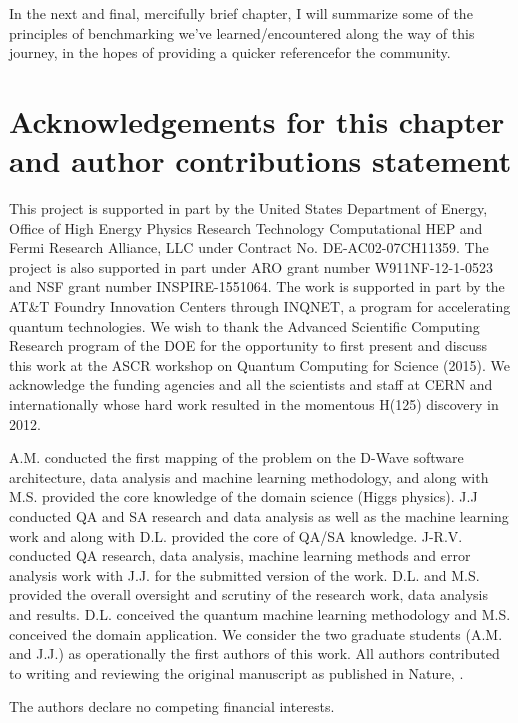 In the next and final, mercifully brief chapter, I will summarize some of the principles of benchmarking we've learned/encountered along the way of this journey, in the hopes of providing a quicker referencefor the community.


\section{Acknowledgements for this chapter and author contributions statement}
This project is supported in part by the  United States Department of Energy, Office of High Energy Physics Research Technology Computational HEP and Fermi Research Alliance, LLC under Contract No. DE-AC02-07CH11359.  The project is also supported in part under ARO grant number W911NF-12-1-0523 and NSF grant number INSPIRE-1551064. The work is supported in part by the AT\&T Foundry Innovation Centers through INQNET, a program for accelerating quantum technologies.  We wish to thank the Advanced Scientific Computing Research program of the DOE for the opportunity to first present and discuss this work at the ASCR workshop on Quantum Computing for Science (2015). We  acknowledge the funding agencies and all the scientists and staff at CERN and internationally whose  hard work resulted in the momentous H(125) discovery in 2012.

A.M. conducted  the first mapping of the problem on the D-Wave software architecture, data analysis and machine learning methodology,  and along with M.S. provided the core knowledge of the domain science (Higgs physics). J.J conducted  QA and SA  research and data analysis as well as the machine learning work and along with D.L. provided the core of QA/SA knowledge. J-R.V. conducted  QA research, data analysis, machine learning methods and error analysis work with J.J. for the submitted version of the work.  D.L. and M.S. provided the overall oversight and scrutiny of the research work, data analysis and results.  D.L. conceived the quantum machine learning methodology and M.S. conceived the domain application.   We consider the two graduate students (A.M. and J.J.) as operationally the first authors of this work. All authors contributed to writing and reviewing the original manuscript as published in Nature, \cite{myhiggs}.

The authors declare no competing financial interests.
%

